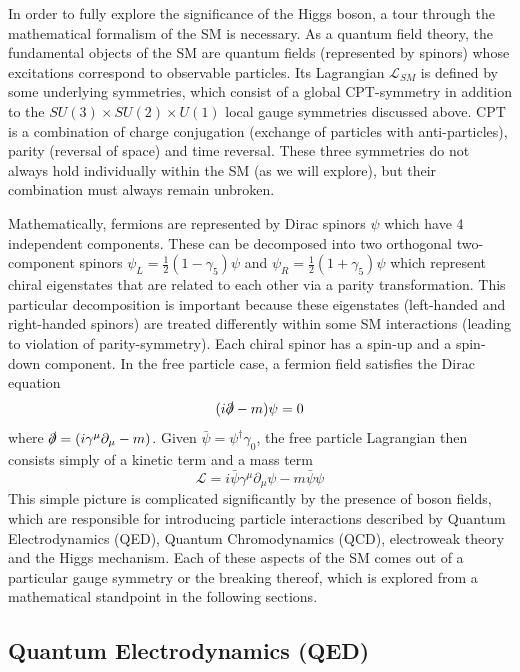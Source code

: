 In order to fully explore the significance of the Higgs boson, a tour through the mathematical formalism of the 
SM is necessary. As a quantum field theory, the fundamental objects of the SM are quantum fields (represented 
by spinors) whose excitations correspond to observable particles. Its Lagrangian $\mathcal{L}_{SM}$ is defined 
by some underlying symmetries, which consist of a global CPT-symmetry in addition to the 
$SU(3)\times SU(2)\times U(1)$ local gauge symmetries discussed above. CPT is a combination of charge 
conjugation (exchange of particles with anti-particles), parity (reversal of space) and time reversal. These three 
symmetries do not always hold individually within the SM (as we will explore), but their combination must always 
remain unbroken. \par

Mathematically, fermions are represented by Dirac spinors $\psi$ which have 4 independent components. 
These can be decomposed into two orthogonal two-component spinors $\psi_L = \frac{1}{2}(1-\gamma_5)\psi$ 
and $\psi_R = \frac{1}{2}(1+\gamma_5)\psi$ which represent chiral eigenstates that are related to each other 
via a parity transformation. This particular decomposition is important because these eigenstates (left-handed 
and right-handed spinors) are treated differently within some SM interactions (leading to violation of 
parity-symmetry). Each chiral spinor has a spin-up and a spin-down component. In the free particle case, a 
fermion field satisfies the Dirac equation 
\begin{equation}
(i\slashed{\partial} - m)\psi = 0
\end{equation}
where $\slashed{\partial} = (i\gamma^{\mu}\partial_{\mu} - m)$. Given $\bar{\psi} = \psi^{\dag}\gamma_0$, 
the free particle Lagrangian then consists simply of a kinetic term and a mass term
\begin{equation}
\mathcal{L} = i\bar{\psi}\gamma^{\mu}\partial_{\mu}\psi - m\bar{\psi}\psi
\end{equation}
This simple picture is complicated significantly by the presence of boson fields, which are responsible for 
introducing particle interactions described by Quantum Electrodynamics (QED), Quantum Chromodynamics 
(QCD), electroweak theory and the Higgs mechanism. Each of these aspects of the SM comes out of a particular 
gauge symmetry or the breaking thereof, which is explored from a mathematical standpoint in the following 
sections.

\subsection{Quantum Electrodynamics (QED)}

